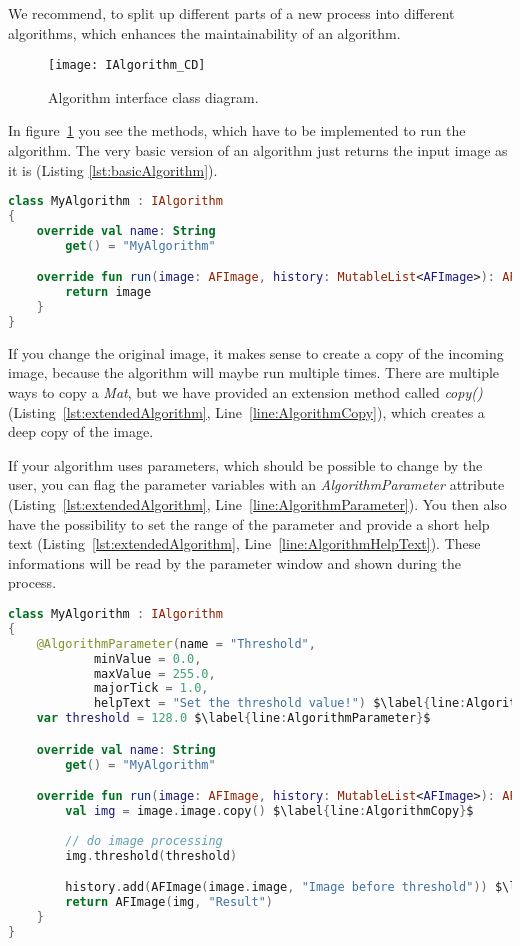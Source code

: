 We recommend, to split up different parts of a new process into different algorithms, which enhances the maintainability of an algorithm.

\begin{figure}[h]
  \centering
      \texttt{[image: IAlgorithm\_CD]}
  \caption{Algorithm interface class diagram.}
  \label{fig:IAlgorithm_CD_DG}
\end{figure}

In figure~\ref{fig:IAlgorithm_CD_DG} you see the methods, which have to be implemented to run the algorithm. The very basic version of an algorithm just returns the input image as it is (Listing \ref{lst:basicAlgorithm}).

\begin{lstlisting}[caption={Basic version of an algorithm.}, label={lst:basicAlgorithm}, language=Kotlin]
class MyAlgorithm : IAlgorithm
{
    override val name: String
        get() = "MyAlgorithm"

    override fun run(image: AFImage, history: MutableList<AFImage>): AFImage {
        return image
    }
}
\end{lstlisting}

If you change the original image, it makes sense to create a copy of the incoming image, because the algorithm will maybe run multiple times. There are multiple ways to copy a \textit{Mat}, but we have provided an extension method called \textit{copy()} (Listing~\ref{lst:extendedAlgorithm}, Line~\ref{line:AlgorithmCopy}), which creates a deep copy of the image.

If your algorithm uses parameters, which should be possible to change by the user, you can flag the parameter variables with an \textit{AlgorithmParameter} attribute (Listing~\ref{lst:extendedAlgorithm}, Line~\ref{line:AlgorithmParameter}). You then also have the possibility to set the range of the parameter and provide a short help text (Listing~\ref{lst:extendedAlgorithm}, Line~\ref{line:AlgorithmHelpText}). These informations will be read by the parameter window and shown during the process.

\begin{lstlisting}[caption={Extended version of an algorithm.}, label={lst:extendedAlgorithm}, language=Kotlin, escapechar=$]
class MyAlgorithm : IAlgorithm
{
    @AlgorithmParameter(name = "Threshold",
            minValue = 0.0,
            maxValue = 255.0,
            majorTick = 1.0,
            helpText = "Set the threshold value!") $\label{line:AlgorithmHelpText}$
    var threshold = 128.0 $\label{line:AlgorithmParameter}$

    override val name: String
        get() = "MyAlgorithm"

    override fun run(image: AFImage, history: MutableList<AFImage>): AFImage {
        val img = image.image.copy() $\label{line:AlgorithmCopy}$
        
        // do image processing
        img.threshold(threshold)

        history.add(AFImage(image.image, "Image before threshold")) $\label{line:AlgorithmHistory}$
        return AFImage(img, "Result")
    }
}
\end{lstlisting}

